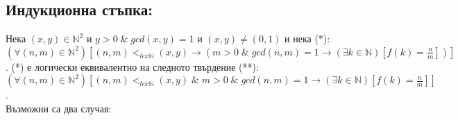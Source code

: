 \documentclass[a4paper, 12pt, oneside]{article}
\begin{document}
\subsection*{Индукционна стъпка:}
Нека \((x, y) \in \mathbb{N}^2\) и \(y > 0 \; \& \; gcd(x, y) = 1\) и \((x, y) \neq (0, 1)\) и нека (*):\\
\((\forall (n, m) \in \mathbb{N}^2)\left[(n, m) <_{lex\mathbb{N}} (x, y) \longrightarrow \left(m > 0 \; \& \; gcd(n, m) = 1 \longrightarrow (\exists k \in \mathbb{N})\left[f(k) = \displaystyle\frac{n}{m}\right]\right)\right]\).
(*) е логически еквивалентно на следното твърдение (**): \\
\((\forall (n, m) \in \mathbb{N}^2)\left[(n, m) <_{lex\mathbb{N}} (x, y) \; \& \; m > 0 \; \& \; gcd(n, m) = 1 \longrightarrow (\exists k \in \mathbb{N})\left[f(k) = \displaystyle\frac{n}{m}\right]\right]\). \\
Възможни са два случая:
\end{document}
